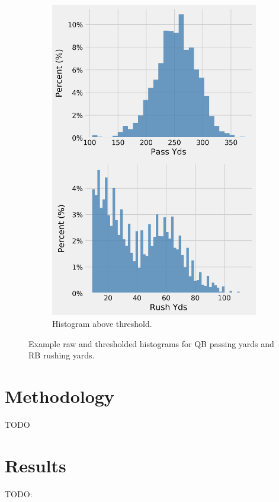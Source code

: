 \documentclass[12pt]{article}
\begin{document}
\begin{figure}[H]
\begin{subfigure}[b]{0.450\textwidth}
    \includegraphics[width=1\textwidth]{../figures/no_theshold_example_hists_RB}
    \caption{Histogram above threshold.}
  \end{subfigure}
  \caption{Example raw and thresholded histograms for QB passing yards and RB rushing yards.}
\end{figure}


\pagebreak
\section{Methodology}
TODO



\pagebreak
\section{Results}
TODO: 
\end{document}
